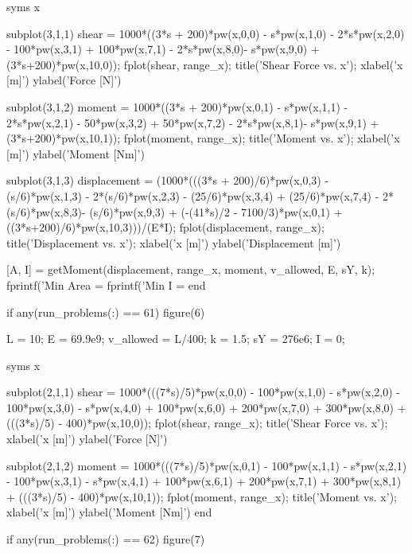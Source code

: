 \documentclass[a4paper]{article}
\begin{document}
\begin{verbatim*}
    syms x

    subplot(3,1,1)
    shear = 1000*((3*s + 200)*pw(x,0,0) - s*pw(x,1,0) - 2*s*pw(x,2,0) - 100*pw(x,3,1) + 100*pw(x,7,1) - 2*s*pw(x,8,0)- s*pw(x,9,0) + (3*s+200)*pw(x,10,0));
    fplot(shear, range_x);
    title('Shear Force vs. x');
    xlabel('x [m]')
    ylabel('Force [N]')

    subplot(3,1,2)
    moment = 1000*((3*s + 200)*pw(x,0,1) - s*pw(x,1,1) - 2*s*pw(x,2,1) - 50*pw(x,3,2) + 50*pw(x,7,2) - 2*s*pw(x,8,1)- s*pw(x,9,1) + (3*s+200)*pw(x,10,1));
    fplot(moment, range_x);
    title('Moment vs. x');
    xlabel('x [m]')
    ylabel('Moment [Nm]')

    subplot(3,1,3)
    displacement = (1000*(((3*s + 200)/6)*pw(x,0,3) - (s/6)*pw(x,1,3) - 2*(s/6)*pw(x,2,3) - (25/6)*pw(x,3,4) + (25/6)*pw(x,7,4) - 2*(s/6)*pw(x,8,3)- (s/6)*pw(x,9,3) + (-(41*s)/2 - 7100/3)*pw(x,0,1) + ((3*s+200)/6)*pw(x,10,3)))/(E*I);
    fplot(displacement, range_x);
    title('Displacement vs. x');
    xlabel('x [m]')
    ylabel('Displacement [m]')

    [A, I] = getMoment(displacement, range_x, moment, v_allowed, E, sY, k);
    fprintf('Min Area = %
    fprintf('Min I = %
end


if any(run_problems(:) == 61)
    figure(6)

    L = 10; %
    E = 69.9e9; %
    v_allowed = L/400; %
    k = 1.5; %
    sY = 276e6; %
    I = 0; %

    syms x

    subplot(2,1,1)
    shear = 1000*(((7*s)/5)*pw(x,0,0) - 100*pw(x,1,0) - s*pw(x,2,0) - 100*pw(x,3,0) - s*pw(x,4,0) + 100*pw(x,6,0) + 200*pw(x,7,0) + 300*pw(x,8,0) + (((3*s)/5) - 400)*pw(x,10,0));
    fplot(shear, range_x);
    title('Shear Force vs. x');
    xlabel('x [m]')
    ylabel('Force [N]')

    subplot(2,1,2)
    moment = 1000*(((7*s)/5)*pw(x,0,1) - 100*pw(x,1,1) - s*pw(x,2,1) - 100*pw(x,3,1) - s*pw(x,4,1) + 100*pw(x,6,1) + 200*pw(x,7,1) + 300*pw(x,8,1) + (((3*s)/5) - 400)*pw(x,10,1));
    fplot(moment, range_x);
    title('Moment vs. x');
    xlabel('x [m]')
    ylabel('Moment [Nm]')
end

if any(run_problems(:) == 62)
    figure(7)


\end{verbatim*}
\end{document}
